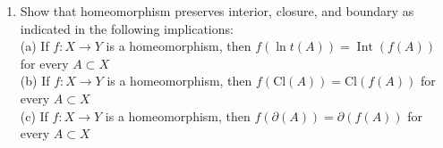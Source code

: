 \documentclass[12pt]{article}
\newcommand{\pb}{\textit{\textcolor{orange}{PB: }}}
\begin{document}
\begin{enumerate}
	\item[\pb4.32] Show that homeomorphism preserves interior, closure, and boundary as indicated in the following implications:\\
	(a) If $f: X \rightarrow Y$ is a homeomorphism, then $f(\ln t(A))=\operatorname{Int}(f(A))$ for every $A \subset X$\\
	(b) If $f: X \rightarrow Y$ is a homeomorphism, then $f(\mathrm{Cl}(A))=\mathrm{Cl}(f(A))$ for every $A \subset X$\\
	(c) If $f: X \rightarrow Y$ is a homeomorphism, then $f(\partial(A))=\partial(f(A))$ for every $A \subset X$\\
	
	


\end{enumerate}
\end{document}
